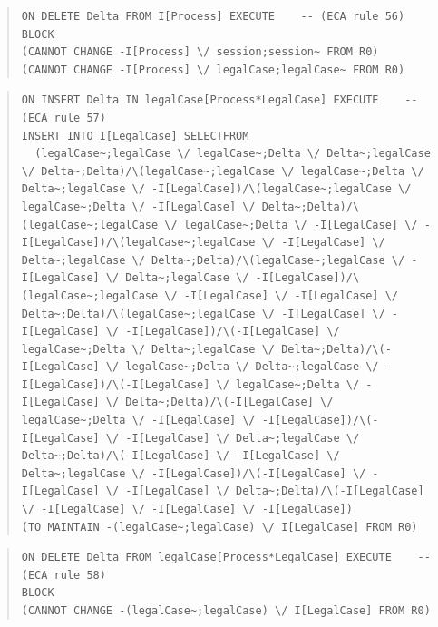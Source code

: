 \documentclass[10pt,a4paper]{report}              %
\theoremstyle{plain}\theorembodyfont{\rmfamily}\newtheorem{definition}{Definition}[section]
\theoremstyle{plain}\theorembodyfont{\rmfamily}\newtheorem{designrule}[definition]{Requirement}
\begin{document}
\begin{quote}
\begin{verbatim}
ON DELETE Delta FROM I[Process] EXECUTE    -- (ECA rule 56)
BLOCK
(CANNOT CHANGE -I[Process] \/ session;session~ FROM R0)
(CANNOT CHANGE -I[Process] \/ legalCase;legalCase~ FROM R0)
\end{verbatim}
\end{quote}
\begin{quote}
\begin{verbatim}
ON INSERT Delta IN legalCase[Process*LegalCase] EXECUTE    -- (ECA rule 57)
INSERT INTO I[LegalCase] SELECTFROM
  (legalCase~;legalCase \/ legalCase~;Delta \/ Delta~;legalCase \/ Delta~;Delta)/\(legalCase~;legalCase \/ legalCase~;Delta \/ Delta~;legalCase \/ -I[LegalCase])/\(legalCase~;legalCase \/ legalCase~;Delta \/ -I[LegalCase] \/ Delta~;Delta)/\(legalCase~;legalCase \/ legalCase~;Delta \/ -I[LegalCase] \/ -I[LegalCase])/\(legalCase~;legalCase \/ -I[LegalCase] \/ Delta~;legalCase \/ Delta~;Delta)/\(legalCase~;legalCase \/ -I[LegalCase] \/ Delta~;legalCase \/ -I[LegalCase])/\(legalCase~;legalCase \/ -I[LegalCase] \/ -I[LegalCase] \/ Delta~;Delta)/\(legalCase~;legalCase \/ -I[LegalCase] \/ -I[LegalCase] \/ -I[LegalCase])/\(-I[LegalCase] \/ legalCase~;Delta \/ Delta~;legalCase \/ Delta~;Delta)/\(-I[LegalCase] \/ legalCase~;Delta \/ Delta~;legalCase \/ -I[LegalCase])/\(-I[LegalCase] \/ legalCase~;Delta \/ -I[LegalCase] \/ Delta~;Delta)/\(-I[LegalCase] \/ legalCase~;Delta \/ -I[LegalCase] \/ -I[LegalCase])/\(-I[LegalCase] \/ -I[LegalCase] \/ Delta~;legalCase \/ Delta~;Delta)/\(-I[LegalCase] \/ -I[LegalCase] \/ Delta~;legalCase \/ -I[LegalCase])/\(-I[LegalCase] \/ -I[LegalCase] \/ -I[LegalCase] \/ Delta~;Delta)/\(-I[LegalCase] \/ -I[LegalCase] \/ -I[LegalCase] \/ -I[LegalCase])
(TO MAINTAIN -(legalCase~;legalCase) \/ I[LegalCase] FROM R0)
\end{verbatim}
\end{quote}
\begin{quote}
\begin{verbatim}
ON DELETE Delta FROM legalCase[Process*LegalCase] EXECUTE    -- (ECA rule 58)
BLOCK
(CANNOT CHANGE -(legalCase~;legalCase) \/ I[LegalCase] FROM R0)
\end{verbatim}
\end{quote}
\end{document}

